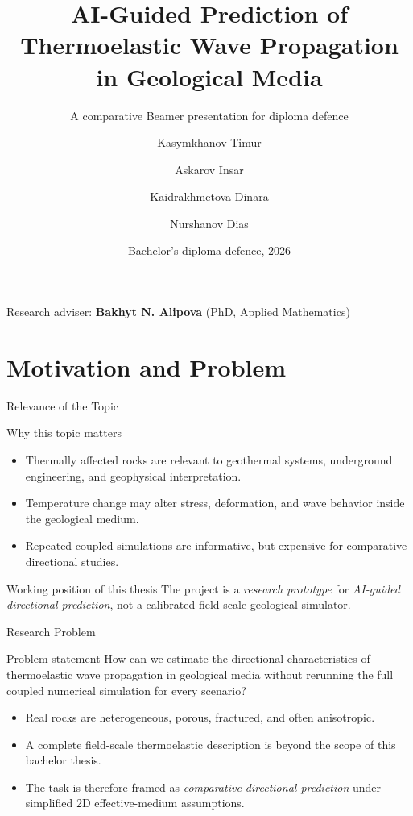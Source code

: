 \documentclass[aspectratio=169,10pt]{beamer}
\title[AI-Guided Thermoelastic Prediction]{%
  AI-Guided Prediction of Thermoelastic Wave Propagation%
  \texorpdfstring{\\}{ }%
  in Geological Media%
}
\subtitle{A comparative Beamer presentation for diploma defence}
\author[Group of 4]{%
  Kasymkhanov Timur \and Askarov Insar \and Kaidrakhmetova Dinara \and Nurshanov Dias%
}
\institute{International Information Technology University}
\date{Bachelor's diploma defence, 2026}
\begin{document}
\begin{frame}[plain]
  \titlepage
  \vfill
  \begin{center}\footnotesize
    Research adviser: \textbf{Bakhyt N. Alipova} (PhD, Applied Mathematics)
  \end{center}
\end{frame}

\section{Motivation and Problem}

\begin{frame}{Relevance of the Topic}
  \begin{block}{Why this topic matters}
    \begin{itemize}
      \item Thermally affected rocks are relevant to geothermal systems,
            underground engineering, and geophysical interpretation.
      \item Temperature change may alter stress, deformation, and wave behavior
            inside the geological medium.
      \item Repeated coupled simulations are informative, but expensive for
            comparative directional studies.
    \end{itemize}
  \end{block}
  \vskip 6pt
  \begin{exampleblock}{Working position of this thesis}
    The project is a \emph{research prototype} for
    \emph{AI-guided directional prediction}, not a calibrated
    field-scale geological simulator.
  \end{exampleblock}
\end{frame}

\begin{frame}{Research Problem}
  \begin{exampleblock}{Problem statement}
    How can we estimate the directional characteristics of thermoelastic
    wave propagation in geological media without rerunning the full coupled
    numerical simulation for every scenario?
  \end{exampleblock}
  \vskip 6pt
  \begin{itemize}
    \item Real rocks are heterogeneous, porous, fractured, and often anisotropic.
    \item A complete field-scale thermoelastic description is beyond the scope
          of this bachelor thesis.
    \item The task is therefore framed as \emph{comparative directional prediction}
          under simplified 2D effective-medium assumptions.
  \end{itemize}
\end{frame}
\end{document}
